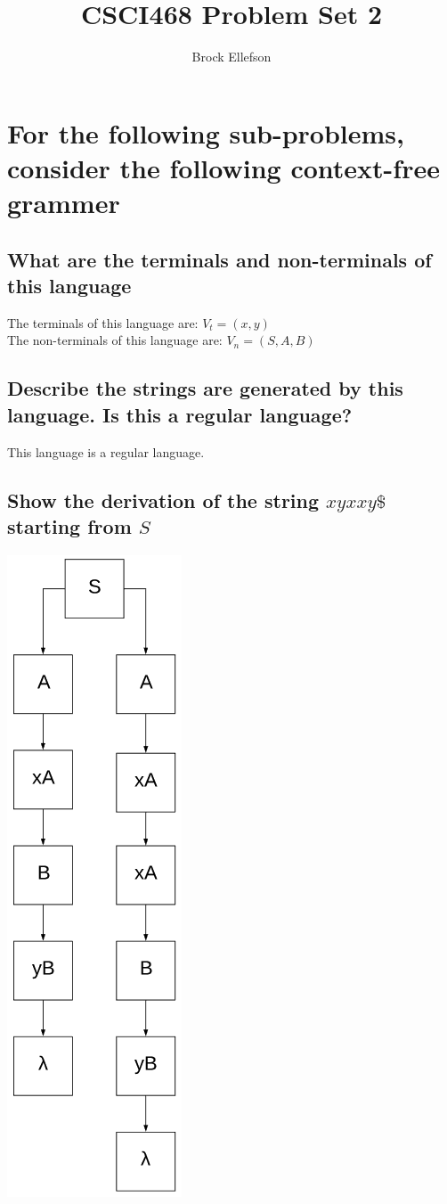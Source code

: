 \documentclass[10pt,a4paper]{article}
\author{Brock Ellefson}
\title{CSCI468 Problem Set 2}
\begin{document}
\section{For the following sub-problems, consider the following context-free grammer}
\subsection{What are the terminals and non-terminals of this language}
The terminals of this language are: $V_{t} = (x , y)$ \\
The non-terminals of this language are: $V_{n} = (S, A, B)$

\subsection{Describe the strings are generated by this language. Is this a regular language?}
This language is a regular language.

\subsection{Show the derivation of the string $xyxxy\$$ starting from $S$}
\includegraphics[scale=.5]{parsetree.png}
\end{document}
